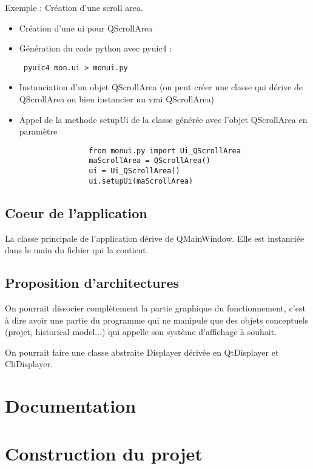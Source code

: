\documentclass[12pt,a4paper]{article}
\begin{document}
        Exemple : Création d'une scroll area.
        \begin{itemize}
            \item Création d'une ui pour QScrollArea
            \item Génération du code python avec pyuic4 :\begin{verbatim} pyuic4 mon.ui > monui.py \end{verbatim}
            \item Instanciation d'un objet QScrollArea (on peut créer une classe qui dérive de QScrollArea ou bien instancier un vrai QScrollArea)
            \item Appel de la methode setupUi de la classe générée avec l'objet QScrollArea en paramètre
                \begin{verbatim}
                from monui.py import Ui_QScrollArea
                maScrollArea = QScrollArea()
                ui = Ui_QScrollArea()
                ui.setupUi(maScrollArea)
                \end{verbatim}
        \end{itemize}
    \subsection{Coeur de l'application}
        La classe principale de l'application dérive de QMainWindow. Elle est instanci\'ee dans le main du fichier qui la contient.


    \subsection{Proposition d'architectures}
        On pourrait dissocier complètement la partie graphique du fonctionnement, c'est à dire avoir une partie du programme
        qui ne manipule que des objets conceptuels (projet, historical model...) qui appelle son système d'affichage à souhait.

        On pourrait faire une classe abstraite Displayer dérivée en QtDisplayer et CliDisplayer.


\section{Documentation}

\section{Construction du projet}
\end{document}
